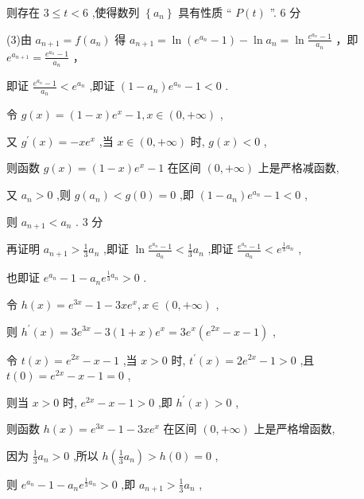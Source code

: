 \documentclass[10pt]{article}
\begin{document}
则存在 \(3 \leq  t < 6\) ,使得数列 \(\left\{  {a}_{n}\right\}\) 具有性质 “ \(P\left( t\right)\) ”. 6 分

(3)由 \({a}_{n + 1} = f\left( {a}_{n}\right)\) 得 \({a}_{n + 1} = \ln \left( {{e}^{{a}_{n}} - 1}\right)  - \ln {a}_{n} = \ln \frac{{e}^{{a}_{n}} - 1}{{a}_{n}}\) ，即 \({e}^{{a}_{n + 1}} = \frac{{e}^{{a}_{n}} - 1}{{a}_{n}}\) ，

即证 \(\frac{{e}^{{a}_{n}} - 1}{{a}_{n}} < {e}^{{a}_{n}}\) ,即证 \(\left( {1 - {a}_{n}}\right) {e}^{{a}_{n}} - 1 < 0\) .

令 \(g\left( x\right)  = \left( {1 - x}\right) {e}^{x} - 1,x \in  \left( {0, + \infty }\right)\) ,

又 \({g}^{\prime }\left( x\right)  =  - x{e}^{x}\) ,当 \(x \in  \left( {0, + \infty }\right)\) 时, \(g\left( x\right)  < 0\) ,

则函数 \(g\left( x\right)  = \left( {1 - x}\right) {e}^{x} - 1\) 在区间 \(\left( {0, + \infty }\right)\) 上是严格减函数,

又 \({a}_{n} > 0\) ,则 \(g\left( {a}_{n}\right)  < g\left( 0\right)  = 0\) ,即 \(\left( {1 - {a}_{n}}\right) {e}^{{a}_{n}} - 1 < 0\) ,

则 \({a}_{n + 1} < {a}_{n}\) . 3 分

再证明 \({a}_{n + 1} > \frac{1}{3}{a}_{n}\) ,即证 \(\ln \frac{{e}^{{a}_{n}} - 1}{{a}_{n}} < \frac{1}{3}{a}_{n}\) ,即证 \(\frac{{e}^{{a}_{n}} - 1}{{a}_{n}} < {e}^{\frac{1}{3}{a}_{n}}\) ,

也即证 \({e}^{{a}_{n}} - 1 - {a}_{n}{e}^{\frac{1}{3}{a}_{n}} > 0\) .

令 \(h\left( x\right)  = {e}^{3x} - 1 - {3x}{e}^{x},x \in  \left( {0, + \infty }\right)\) ,

则 \({h}^{\prime }\left( x\right)  = 3{e}^{3x} - 3\left( {1 + x}\right) {e}^{x} = 3{e}^{x}\left( {{e}^{2x} - x - 1}\right)\) ,

令 \(t\left( x\right)  = {e}^{2x} - x - 1\) ,当 \(x > 0\) 时, \({t}^{\prime }\left( x\right)  = 2{e}^{2x} - 1 > 0\) ,且 \(t\left( 0\right)  = {e}^{2x} - x - 1 = 0\) ,

则当 \(x > 0\) 时, \({e}^{2x} - x - 1 > 0\) ,即 \({h}^{\prime }\left( x\right)  > 0\) ,

则函数 \(h\left( x\right)  = {e}^{3x} - 1 - {3x}{e}^{x}\) 在区间 \(\left( {0, + \infty }\right)\) 上是严格增函数,

因为 \(\frac{1}{3}{a}_{n} > 0\) ,所以 \(h\left( {\frac{1}{3}{a}_{n}}\right)  > h\left( 0\right)  = 0\) ,

则 \({e}^{{a}_{n}} - 1 - {a}_{n}{e}^{\frac{1}{3}{a}_{n}} > 0\) ,即 \({a}_{n + 1} > \frac{1}{3}{a}_{n}\) ,
\end{document}

